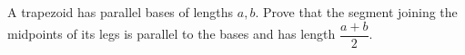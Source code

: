A trapezoid has parallel bases of lengths $ a,b $. Prove that the segment joining the midpoints of its legs is parallel to the bases and has length $\dfrac{a+b}{2}$.
